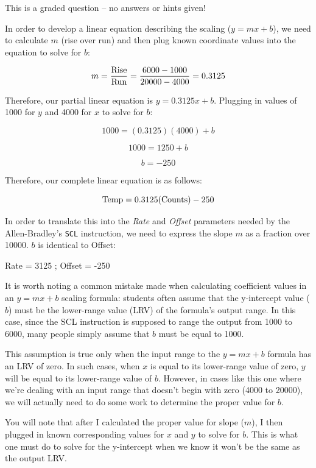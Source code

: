 \vfil 

\eject






This is a graded question -- no answers or hints given!







In order to develop a linear equation describing the scaling ($y = mx + b$), we need to calculate $m$ (rise over run) and then plug known coordinate values into the equation to solve for $b$:

$$m = {\hbox{Rise} \over \hbox{Run}} = {6000 - 1000 \over 20000 - 4000} = 0.3125$$

Therefore, our partial linear equation is $y = 0.3125 x + b$.  Plugging in values of 1000 for $y$ and 4000 for $x$ to solve for $b$:

$$1000 = (0.3125)(4000) + b$$

$$1000 = 1250 + b$$

$$b = -250$$

Therefore, our complete linear equation is as follows:

$$\hbox{Temp} = 0.3125(\hbox{Counts}) - 250$$

\vskip 30pt

In order to translate this into the {\it Rate} and {\it Offset} parameters needed by the Allen-Bradley's {\tt SCL} instruction, we need to express the slope $m$ as a fraction over 10000.  $b$ is identical to Offset:

\vskip 10pt

Rate = 3125 ; Offset = -250

\vskip 10pt

It is worth noting a common mistake made when calculating coefficient values in an $y = mx + b$ scaling formula: students often assume that the y-intercept value ($b$) must be the lower-range value (LRV) of the formula's output range.  In this case, since the SCL instruction is supposed to range the output from 1000 to 6000, many people simply assume that $b$ must be equal to 1000.

This assumption is true only when the input range to the $y = mx + b$ formula has an LRV of zero.  In such cases, when $x$ is equal to its lower-range value of zero, $y$ will be equal to its lower-range value of $b$.  However, in cases like this one where we're dealing with an input range that doesn't begin with zero (4000 to 20000), we will actually need to do some work to determine the proper value for $b$.

You will note that after I calculated the proper value for slope ($m$), I then plugged in known corresponding values for $x$ and $y$ to solve for $b$.  This is what one must do to solve for the y-intercept when we know it won't be the same as the output LRV.




